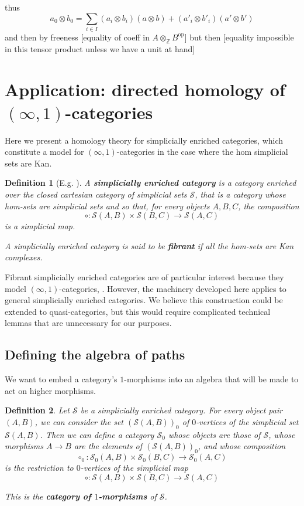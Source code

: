 \documentclass[a4paper,fleqn]{cas-sc}
\newtheorem{dfnt}{Definition}%
\newcommand{\cS}{{\mathcal{S}}}
\begin{document}
thus
\[
a_0 \otimes b_0 = \sum_{i \in I} (a_i \otimes b_i) (a \otimes b)
+(a'_i \otimes b'_i) (a' \otimes b')
\]
and then by freeness [equality of coeff in $A \otimes_{\mathbb{Z}} B^{\text{op}}$]
but then [equality impossible in this tensor product unless we have a unit at hand]
\fi


\section{Application: directed homology of  $(\infty,1)$-categories}

\label{sec:infinityone}

Here we present a homology theory for simplicially enriched categories, which constitute a model for $(\infty,1)$-categories in the case where the hom simplicial sets are Kan.

\begin{dfnt}[E.g. \cite{Lurie}]
A \textbf{simplicially enriched category} is a category enriched over the closed cartesian category of simplicial sets $\cS$, that is a category whose hom-sets are simplicial sets and so that, for every objects $A,B,C$, the composition
\[
\circ : \cS(A,B) \times \cS(B,C) \to \cS(A,C)
\]
is a simplicial map.

A simplicially enriched category is said to be \textbf{fibrant} if all the hom-sets are Kan complexes.
\end{dfnt}

Fibrant simplicially enriched categories are of particular interest because they model $(\infty,1)$-categories, \cite{Lurie}. However, the machinery developed here applies to general simplicially enriched categories. We believe this construction could be extended to quasi-categories, but this would require complicated technical lemmas that are unnecessary for our purposes.

\subsection{Defining the algebra of paths}
We want to embed a category's $1$-morphisms into an algebra that will be made to act on higher morphisms.
\begin{dfnt}
Let $\cS$ be a simplicially enriched category. For every object pair $(A, B)$, we can consider the set $\left( \cS(A,B) \right)_0$ of $0$-vertices of the simplicial set $\cS(A,B)$. Then we can define a category $\cS_0$ whose objects are those of $\cS$, whose morphisms $A \to B$ are the elements of $\left( \cS(A,B) \right)_0$, and whose composition 
    \[\circ_0: \cS_0(A,B) \times \cS_0(B,C) \to \cS_0 (A,C)\]
    is the restriction to $0$-vertices of the simplicial map 
    \[\circ : \cS(A,B) \times \cS(B,C) \to \cS(A,C)\]
    
This is the \textbf{category of $1$-morphisms} of $\cS$.
\end{dfnt}
\end{document}
